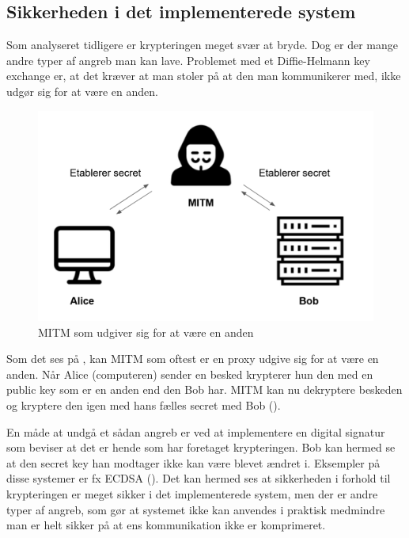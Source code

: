 \subsection{Sikkerheden i det implementerede system}
Som analyseret tidligere er krypteringen meget svær at bryde. Dog er der mange andre typer af angreb man kan lave. Problemet med et Diffie-Helmann key exchange er, at det kræver at man stoler på at den man kommunikerer med, ikke udgør sig for at være en anden. 
\begin{figure}[htbp]
    \centering
    \includegraphics[width=0.6\linewidth]{images/MITM.png}
    \caption{MITM som udgiver sig for at være en anden}
    \label{fig:MITM}
\end{figure}
\FloatBarrier

Som det ses på , kan MITM som oftest er en proxy udgive sig for at være en anden. Når Alice (computeren) sender en besked krypterer hun den med en public key som er en anden end den Bob har. MITM kan nu dekryptere beskeden og kryptere den igen med hans fælles secret med Bob (\cite{seanriley12017}). 

En måde at undgå et sådan angreb er ved at implementere en digital signatur som beviser at det er hende som har foretaget krypteringen. Bob kan hermed se at den secret key han modtager ikke kan være blevet ændret i. Eksempler på disse systemer er fx ECDSA (\cite{youssefelhousni2018}). 
Det kan hermed ses at sikkerheden i forhold til krypteringen er meget sikker i det implementerede system, men der er andre typer af angreb, som gør at systemet ikke kan anvendes i praktisk medmindre man er helt sikker på at ens kommunikation ikke er komprimeret. 
